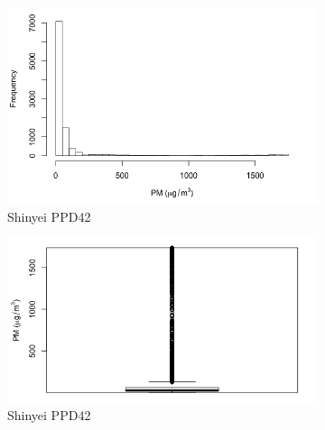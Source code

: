 \documentclass[11pt]{report}
\begin{document}
\begin{figure}[!tbp]
    \begin{minipage}{1\linewidth}
        \centering
            \begin{subfigure}[t]{.4\linewidth}
                \includegraphics[width=\textwidth]{images/pm_histogram}
                \caption{Shinyei PPD42}
                \label{fig:pm_histogram}
            \end{subfigure}
            \hfill
            \begin{subfigure}[t]{.4\linewidth}
            	\includegraphics[width=\textwidth]{images/pm_boxplot}
            	\caption{Shinyei PPD42}
            	\label{fig:pm_boxplot}
	   \end{subfigure}
        \end{minipage}
    \begin{minipage}{1\linewidth}
    \vspace{0pt}
            \begin{subfigure}[t]{.4\linewidth}

\end{subfigure}
\end{minipage}
\end{figure}
\end{document}
